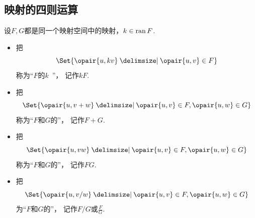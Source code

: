 \subsection{映射的四则运算}
\begin{definition}
设\(F,G\)都是同一个映射空间中的映射，\(k \in \operatorname{ran} F\).
\begin{itemize}
	\item 把\begin{equation*}
		\Set{ \opair{u,kv} \given \opair{u,v} \in F }
	\end{equation*}称为“\(F\)的\(k\)~”，
	记作\(k F\).
	\item 把\begin{equation*}
		\Set{ \opair{u,v+w} \given \opair{u,v} \in F, \opair{u,w} \in G }
	\end{equation*}称为“\(F\)和\(G\)的”，
	记作\(F + G\).
	\item 把\begin{equation*}
		\Set{ \opair{u,vw} \given \opair{u,v} \in F, \opair{u,w} \in G }
	\end{equation*}称为“\(F\)和\(G\)的”，
	记作\(F G\).
	\item 把\begin{equation*}
		\Set{ \opair{u,v/w} \given \opair{u,v} \in F, \opair{u,w} \in G }
	\end{equation*}为“\(F\)和\(G\)的”，
	记作\(F/G\)或\(\frac{F}{G}\).
\end{itemize}
\end{definition}
